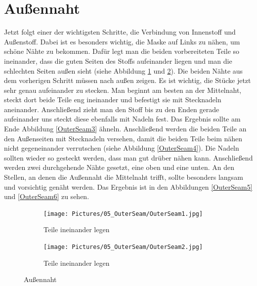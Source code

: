 \documentclass[12pt,parskip=full]{scrartcl}
\begin{document}
\section{Außennaht}
Jetzt folgt einer der wichtigsten Schritte, die Verbindung von Innenstoff und Außenstoff. Dabei ist es besonders wichtig, die Maske auf Links zu nähen, um schöne Nähte zu bekommen. Dafür legt man die beiden vorbereiteten Teile so ineinander, dass die guten Seiten des Stoffs aufeinander liegen und man die schlechten Seiten außen sieht (siehe Abbildung \ref{OuterSeam1} und \ref{OuterSeam2}). Die beiden Nähte aus dem vorherigen Schritt müssen nach außen zeigen. Es ist wichtig, die Stücke jetzt sehr genau aufeinander zu stecken. Man beginnt am besten an der Mittelnaht, steckt dort beide Teile eng ineinander und befestigt sie mit Stecknadeln aneinander. Anschließend zieht man den Stoff bis zu den Enden gerade aufeinander uns steckt diese ebenfalls mit Nadeln fest. Das Ergebnis sollte am Ende Abbildung \ref{OuterSeam3} ähneln. Anschließend werden die beiden Teile an den Außenseiten mit Stecknadeln versehen, damit die beiden Teile beim nähen nicht gegeneinander verrutschen (siehe Abbildung \ref{OuterSeam4}). Die Nadeln sollten wieder so gesteckt werden, dass man gut drüber nähen kann. Anschließend werden zwei durchgehende Nähte gesetzt, eine oben und eine unten. An den Stellen, an denen die Außennaht die Mittelnaht trifft, sollte besonders langsam und vorsichtig genäht werden. Das Ergebnis ist in den Abbildungen \ref{OuterSeam5} und \ref{OuterSeam6} zu sehen.

\begin{figure}[hb]
    \vspace{0.5cm}
    \centering
    \begin{subfigure}{0.48\textwidth}
        \centering
        \texttt{[image: Pictures/05\_OuterSeam/OuterSeam1.jpg]}
        \caption{Teile ineinander legen}
        \label{OuterSeam1}
    \end{subfigure}
    \begin{subfigure}{0.48\textwidth}
        \centering
        \texttt{[image: Pictures/05\_OuterSeam/OuterSeam2.jpg]}
        \caption{Teile ineinander legen}
        \label{OuterSeam2}
    \end{subfigure}
    \caption{Außennaht}
    \label{OuterSeamFirst}
\end{figure}
\end{document}
